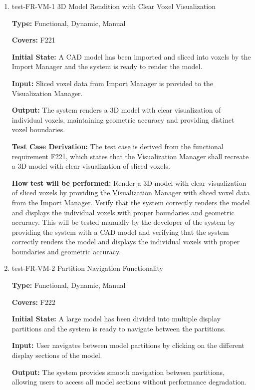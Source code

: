 \documentclass[12pt, titlepage]{article}
\begin{document}
\begin{enumerate}

\item{test-FR-VM-1 3D Model Rendition with Clear Voxel Visualization\\}
\label{sec:t-vm-1}

\textbf{Type:} Functional, Dynamic, Manual

\textbf{Covers:} F221
					
\textbf{Initial State:} A CAD model has been imported and sliced into voxels by the Import Manager and the system is ready to render the model.
					
\textbf{Input:} Sliced voxel data from Import Manager is provided to the Visualization Manager.
					
\textbf{Output:} The system renders a 3D model with clear visualization of individual voxels, maintaining geometric accuracy and providing distinct voxel boundaries.

\textbf{Test Case Derivation:} The test case is derived from the functional requirement F221, which states that the Visualization Manager shall recreate a 3D model with clear visualization of sliced voxels.
					
\textbf{How test will be performed:} Render a 3D model with clear visualization of sliced voxels by providing the Visualization Manager with sliced voxel data from the Import Manager. Verify that the system correctly renders the model and displays the individual voxels with proper boundaries and geometric accuracy. This will be tested manually by the developer of the system by providing the system with a CAD model and verifying that the system correctly renders the model and displays the individual voxels with proper boundaries and geometric accuracy. 

\item{test-FR-VM-2 Partition Navigation Functionality\\}
\label{sec:t-vm-2}

\textbf{Type:} Functional, Dynamic, Manual

\textbf{Covers:} F222
					
\textbf{Initial State:} A large model has been divided into multiple display partitions and the system is ready to navigate between the partitions.
					
\textbf{Input:} User navigates between model partitions by clicking on the different display sections of the model.
					
\textbf{Output:} The system provides smooth navigation between partitions, allowing users to access all model sections without performance degradation.


\end{enumerate}
\end{document}
